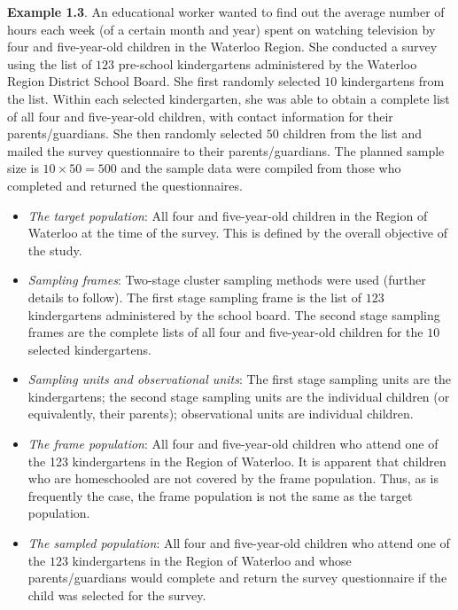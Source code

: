 \textbf{Example 1.3}. An educational worker wanted to find out the average
number of hours each week (of a certain month and year) spent on
watching television by four and five-year-old children in the Waterloo
Region. She conducted a survey using the list of $123$ pre-school
kindergartens administered by the Waterloo Region District School
Board. She first randomly selected $10$ kindergartens from the list.
Within each selected kindergarten, she was able to obtain a complete
list of all four and five-year-old children, with contact information for
their parents/guardians. She then randomly selected $50$ children from
the list and mailed the survey questionnaire to their parents/guardians.
The planned sample size is $ 10\times 50=500 $ and the sample data were
compiled from those who completed and returned the questionnaires.

\begin{itemize}
      \item \emph{The target population}:
            All four and five-year-old children in the Region of Waterloo at
            the time of the survey. This is defined by the overall objective of
            the study.
      \item \emph{Sampling frames}: Two-stage cluster sampling methods were used (further details to
            follow). The first stage sampling frame is the list of $123$
            kindergartens administered by the school board. The second
            stage sampling frames are the complete lists of all four and five-year-old
            children for the $10$ selected kindergartens.
      \item \emph{Sampling units and observational units}: The first stage sampling units are the kindergartens; the second
            stage sampling units are the individual children (or equivalently,
            their parents); observational units are individual children.
      \item \emph{The frame population}: All four and five-year-old children who attend one of the 123
            kindergartens in the Region of Waterloo. It is apparent that
            children who are homeschooled are not covered by the frame
            population. Thus, as is frequently the case, the frame population
            is not the same as the target population.
      \item \emph{The sampled population}: All four and
            five-year-old children who attend one of the $123$
            kindergartens in the Region of Waterloo and whose
            parents/guardians would complete and return the survey
            questionnaire if the child was selected for the survey.
\end{itemize}
